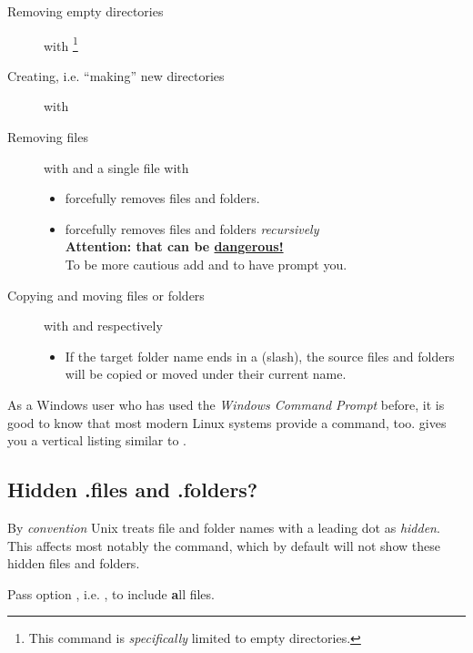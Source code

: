 \documentclass{olli-handout}
\begin{document}
\begin{hintbox}%
	\begin{description}
		\item[Removing empty directories] with \footnote{This command is \emph{specifically} limited to empty directories.}
		\item[Creating, i.e. ``making'' new directories] with 
		\item[Removing files] with  and a single file with 
		\begin{itemize}
			\item[\olliPenR]  forcefully removes files and folders.
			\item[\olliPenR]  forcefully removes files and folders \emph{recursively}\\
            \textbf{Attention: that can be \underline{dangerous!}}\\
            To be more cautious add  and  to have  prompt you.
		\end{itemize}
		\item[Copying and moving files or folders] with  and  respectively
		\begin{itemize}
			\item[\olliPenR] If the target folder name ends in a \TT{/} (slash), the source files and folders will be copied or moved under their current name.
		\end{itemize}
	\end{description}
\end{hintbox}

{\olliHandLeft} As a Windows user who has used the \emph{Windows Command Prompt} before, it is good to know that most modern Linux systems provide a  command, too.  gives you a vertical listing similar to .

\subsection{Hidden .files and .folders?}

By \emph{convention} Unix treats file and folder names with a leading dot as \emph{hidden}. This affects most notably the  command, which by default will not show these hidden files and folders.

\begin{hintbox}
{\olliPenR} Pass option , i.e. , to include \textbf{a}ll files.
\end{hintbox}
\end{document}
